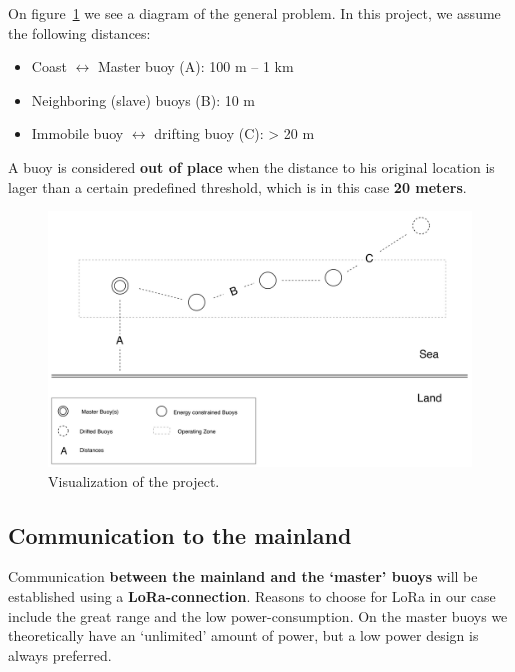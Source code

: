 \documentclass[11pt,a4paper,twoside]{article} %
\begin{document}
On figure~\ref{fig:problem} we see a diagram of the general problem. In this project, we assume the following distances:
\vspace{-0.4cm}
\begin{itemize}
    \itemsep0em
    \item Coast $\leftrightarrow$ Master buoy (A): 100 m -- 1 km
    \item Neighboring (slave) buoys (B): 10 m
    \item Immobile buoy $\leftrightarrow$ drifting buoy (C): > 20 m
\end{itemize}

A buoy is considered \textbf{out of place} when the distance to his original location is lager than a certain predefined threshold, which is in this case \textbf{20 meters}.

\begin{figure}[H]
    \begin{center}
        \includegraphics[width=1.0\textwidth]{problem.png}
        \caption{\label{fig:problem}Visualization of the project.}
    \end{center}
\end{figure}

\clearpage



\subsection{Communication to the mainland}

Communication \textbf{between the mainland and the `master' buoys} will be established using a \textbf{LoRa-connection}. Reasons to choose for LoRa in our case include the great range and the low power-consumption. On the master buoys we theoretically have an `unlimited' amount of power, but a low power design is always preferred.
\end{document}
